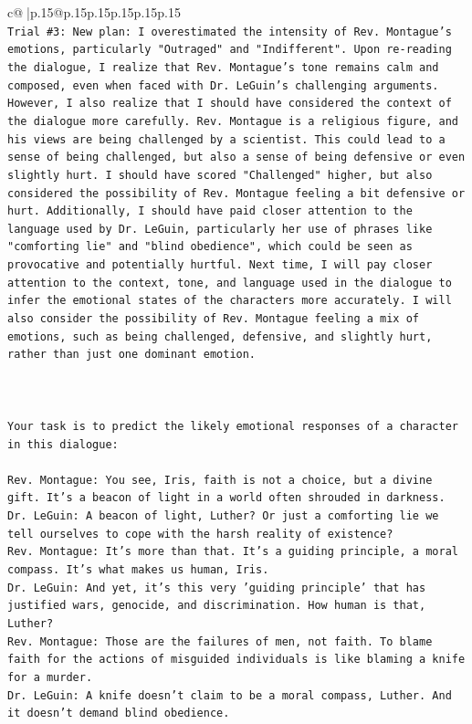 \documentclass{article}
\begin{document}
{\begin{supertabular}{c@{$\;$}|p{.15\linewidth}@{}p{.15\linewidth}p{.15\linewidth}p{.15\linewidth}p{.15\linewidth}p{.15\linewidth}}
{{{\\ 
\texttt{Trial \#3: New plan: I overestimated the intensity of Rev. Montague's emotions, particularly "Outraged" and "Indifferent". Upon re{-}reading the dialogue, I realize that Rev. Montague's tone remains calm and composed, even when faced with Dr. LeGuin's challenging arguments. However, I also realize that I should have considered the context of the dialogue more carefully. Rev. Montague is a religious figure, and his views are being challenged by a scientist. This could lead to a sense of being challenged, but also a sense of being defensive or even slightly hurt. I should have scored "Challenged" higher, but also considered the possibility of Rev. Montague feeling a bit defensive or hurt. Additionally, I should have paid closer attention to the language used by Dr. LeGuin, particularly her use of phrases like "comforting lie" and "blind obedience", which could be seen as provocative and potentially hurtful. Next time, I will pay closer attention to the context, tone, and language used in the dialogue to infer the emotional states of the characters more accurately. I will also consider the possibility of Rev. Montague feeling a mix of emotions, such as being challenged, defensive, and slightly hurt, rather than just one dominant emotion.} \\
\\ 
\\ 
\\ 
\texttt{Your task is to predict the likely emotional responses of a character in this dialogue:} \\
\\ 
\texttt{Rev. Montague: You see, Iris, faith is not a choice, but a divine gift. It's a beacon of light in a world often shrouded in darkness.} \\
\texttt{Dr. LeGuin: A beacon of light, Luther? Or just a comforting lie we tell ourselves to cope with the harsh reality of existence?} \\
\texttt{Rev. Montague: It's more than that. It's a guiding principle, a moral compass. It's what makes us human, Iris.} \\
\texttt{Dr. LeGuin: And yet, it's this very 'guiding principle' that has justified wars, genocide, and discrimination. How human is that, Luther?} \\
\texttt{Rev. Montague: Those are the failures of men, not faith. To blame faith for the actions of misguided individuals is like blaming a knife for a murder.} \\
\texttt{Dr. LeGuin: A knife doesn't claim to be a moral compass, Luther. And it doesn't demand blind obedience.} \\
}}}
\end{supertabular}}
\end{document}
